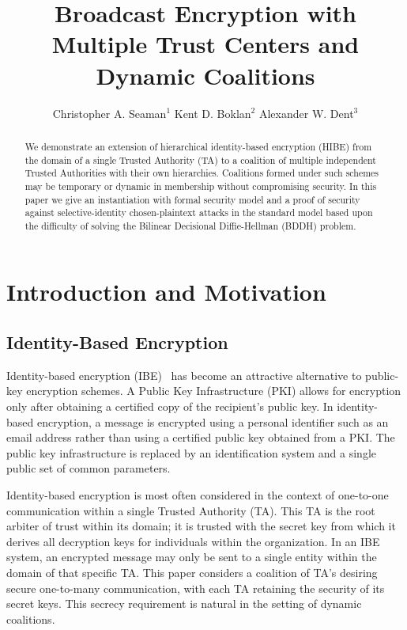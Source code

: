 \documentclass{IEEEtran}
\title{Broadcast Encryption with Multiple Trust Centers and Dynamic Coalitions}
\author{Christopher A. Seaman$^{1}$ \qquad
        Kent D. Boklan$^{2}$ \qquad
        Alexander W. Dent$^{3}$}
\begin{document}
\maketitle

\begin{abstract}
We demonstrate an extension of hierarchical identity-based
encryption (HIBE) from the domain of a single Trusted Authority (TA)
to a coalition of multiple independent Trusted Authorities with
their own hierarchies.  Coalitions formed under such schemes may be
temporary or dynamic in membership without compromising security. In
this paper we give an instantiation with formal security model and a
proof of security against selective-identity chosen-plaintext
attacks in the standard model based upon the difficulty of solving
the Bilinear Decisional Diffie-Hellman (BDDH) problem.
\end{abstract}


\section{Introduction and Motivation}
\subsection{Identity-Based Encryption}
Identity-based encryption (IBE)~\cite{Shamir84} has become an
attractive alternative to public-key encryption schemes. A Public
Key Infrastructure (PKI) allows for encryption only after obtaining
a certified copy of the recipient's public key. In identity-based
encryption, a message is encrypted using a personal identifier such
as an email address rather than using a certified public key
obtained from a PKI. The public key infrastructure is replaced by an
identification system and a single public set of common parameters.

Identity-based encryption is most often considered in the context of
one-to-one communication within a single Trusted Authority (TA).
This TA is the root arbiter of trust within its domain; it is
trusted with the secret key from which it derives all decryption
keys for individuals within the organization. In an IBE system, an
encrypted message may only be sent to a single entity within the
domain of that specific TA. This paper considers a coalition of TA's
desiring secure one-to-many communication, with each TA retaining
the security of its secret keys.  This secrecy requirement is
natural in the setting of dynamic coalitions.
\end{document}

